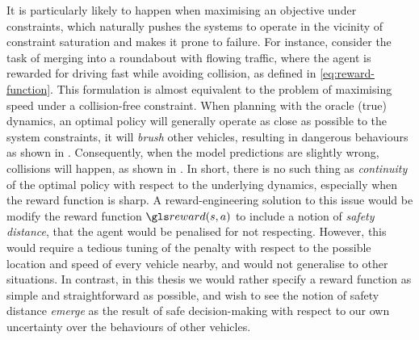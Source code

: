 It is particularly likely to happen when maximising an objective under constraints, which naturally pushes the systems to operate in the vicinity of constraint saturation and makes it prone to failure. For instance, consider the task of merging into a roundabout with flowing traffic, where the agent is rewarded for driving fast while avoiding collision, as defined in \eqref{eq:reward-function}. This formulation is almost equivalent to the problem of maximising speed under a collision-free constraint. When planning with the oracle (true) dynamics, an optimal policy will generally operate as close as possible to the system constraints, \ie it will \emph{brush} other vehicles, resulting in dangerous behaviours as shown in . Consequently, when the model predictions are slightly wrong, collisions will happen, as shown in . In short, there is no such thing as \emph{continuity} of the optimal policy with respect to the underlying dynamics, especially when the reward function is sharp. A reward-engineering solution to this issue would be modify the reward function $\reward(s,a)$ to include a notion of \emph{safety distance}, that the agent would be penalised for not respecting. However, this would require a tedious tuning of the penalty with respect to the possible location and speed of every vehicle nearby, and would not generalise to other situations. In contrast, in this thesis we would rather specify a reward function as simple and straightforward as possible, and wish to see the notion of safety distance \emph{emerge} as the result of safe decision-making with respect to our own uncertainty over the behaviours of other vehicles.

